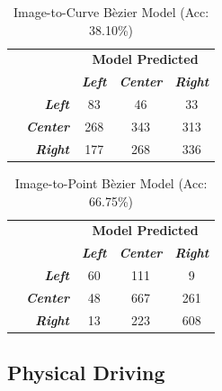 \documentclass[conference]{IEEEtran}
\begin{document}
\begin{table}[btp]
	\centering
	\caption{Image-to-Curve B\`ezier Model (Acc: 38.10\%) }
	\begin{tabular}{|c|r|c|c|c|}
		\multicolumn{2}{c}{} & \multicolumn{3}{c}{\bfseries Model Predicted}\\\cline{3-5}
		\multicolumn{1}{c}{} & & \textbf{\textit{Left}} & \textbf{\textit{Center}} & \textbf{\textit{Right}}\\\hline
		\parbox[t]{2mm}{} & \textbf{\textit{Left}} & 83 & 46 & 33 \\
		& \textbf{\textit{Center}} & 268 & 343 & 313 \\
		& \textbf{\textit{Right}} & 177 & 268 & 336 \\\hline
	\end{tabular}
	\label{tab:i2bc-acc}
\end{table}

\begin{table}[btp]
	\centering
	\caption{Image-to-Point B\`ezier Model (Acc: 66.75\%)}
	\begin{tabular}{|c|r|c|c|c|}
		\multicolumn{2}{c}{} & \multicolumn{3}{c}{\bfseries Model Predicted}\\\cline{3-5}
		\multicolumn{1}{c}{} & & \textbf{\textit{Left}} & \textbf{\textit{Center}} & \textbf{\textit{Right}}\\\hline
		\parbox[t]{2mm}{} & \textbf{\textit{Left}} & 60 & 111 & 9 \\
		& \textbf{\textit{Center}} & 48 & 667 & 261 \\
		& \textbf{\textit{Right}} & 13 & 223 & 608 \\\hline
	\end{tabular}
	\label{tab:i2bp-acc}
\end{table}

\subsection{Physical Driving}
\end{document}
